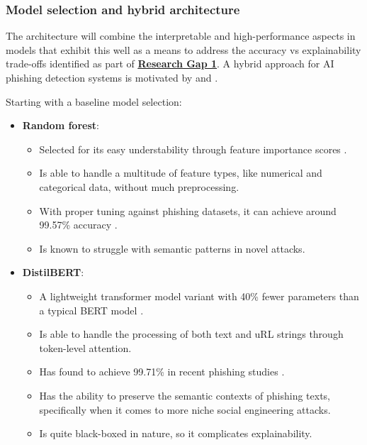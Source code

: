 
\subsubsection*{Model selection and hybrid architecture}
The architecture will combine the interpretable and high-performance aspects in models that exhibit this well as a means to address the accuracy vs explainability trade-offs identified as part of \hyperref[research-gap-1]{\uline{\textbf{Research Gap 1}}}. A hybrid approach for AI phishing detection systems is motivated by \cite{do2024integrated} and \cite{alzahrani2024explainable}.\newline

\noindent Starting with a baseline model selection:

\begin{itemize}
  \item \textbf{Random forest}:
  \begin{itemize}
    \item Selected for its easy understability through feature importance scores \citep{gupta2021novel}.
    \item Is able to handle a multitude of feature types, like numerical and categorical data, without much preprocessing.
    \item With proper tuning against phishing datasets, it can achieve around 99.57\% accuracy \citep{kapoor2024comparative}.
    \item Is known to struggle with semantic patterns in novel attacks.
  \end{itemize}
  \item \textbf{DistilBERT}:
  \begin{itemize}
    \item A lightweight transformer model variant with 40\% fewer parameters than a typical BERT model \citep{sanchez2022phishing}.
    \item Is able to handle the processing of both text and uRL strings through token-level attention.
    \item Has found to achieve 99.71\% in recent phishing studies \citep{do2024integrated}.
    \item Has the ability to preserve the semantic contexts of phishing texts, specifically when it comes to more niche social engineering attacks.
    \item Is quite black-boxed in nature, so it complicates explainability.
  \end{itemize}
\end{itemize}

